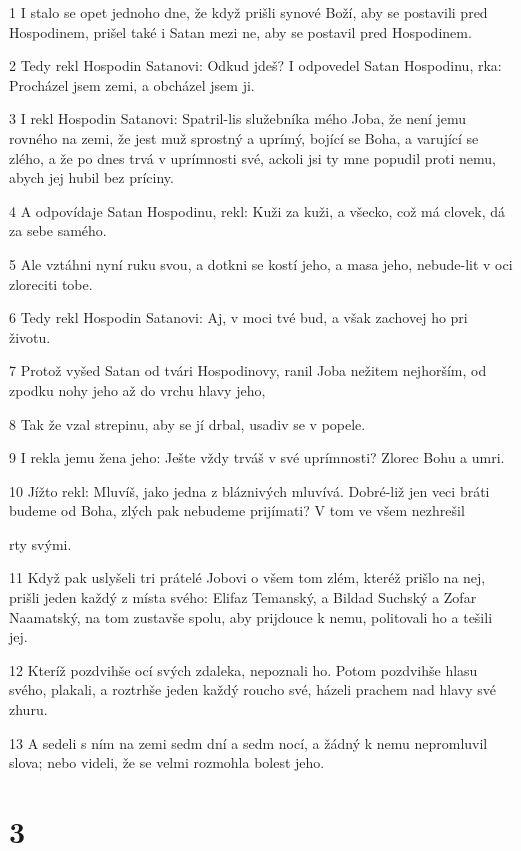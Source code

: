 \par 1 I stalo se opet jednoho dne, že když prišli synové Boží, aby se postavili pred Hospodinem, prišel také i Satan mezi ne, aby se postavil pred Hospodinem.
\par 2 Tedy rekl Hospodin Satanovi: Odkud jdeš? I odpovedel Satan Hospodinu, rka: Procházel jsem zemi, a obcházel jsem ji.
\par 3 I rekl Hospodin Satanovi: Spatril-lis služebníka mého Joba, že není jemu rovného na zemi, že jest muž sprostný a uprímý, bojící se Boha, a varující se zlého, a že po dnes trvá v uprímnosti své, ackoli jsi ty mne popudil proti nemu, abych jej hubil bez príciny.
\par 4 A odpovídaje Satan Hospodinu, rekl: Kuži za kuži, a všecko, což má clovek, dá za sebe samého.
\par 5 Ale vztáhni nyní ruku svou, a dotkni se kostí jeho, a masa jeho, nebude-lit v oci zloreciti tobe.
\par 6 Tedy rekl Hospodin Satanovi: Aj, v moci tvé bud, a však zachovej ho pri životu.
\par 7 Protož vyšed Satan od tvári Hospodinovy, ranil Joba nežitem nejhorším, od zpodku nohy jeho až do vrchu hlavy jeho,
\par 8 Tak že vzal strepinu, aby se jí drbal, usadiv se v popele.
\par 9 I rekla jemu žena jeho: Ješte vždy trváš v své uprímnosti? Zlorec Bohu a umri.
\par 10 Jížto rekl: Mluvíš, jako jedna z bláznivých mluvívá. Dobré-liž jen veci bráti budeme od Boha, zlých pak nebudeme prijímati? V tom ve všem nezhrešil \par rty svými.
\par 11 Když pak uslyšeli tri prátelé Jobovi o všem tom zlém, kteréž prišlo na nej, prišli jeden každý z místa svého: Elifaz Temanský, a Bildad Suchský a Zofar Naamatský, na tom zustavše spolu, aby prijdouce k nemu, politovali ho a tešili jej.
\par 12 Kteríž pozdvihše ocí svých zdaleka, nepoznali ho. Potom pozdvihše hlasu svého, plakali, a roztrhše jeden každý roucho své, házeli prachem nad hlavy své zhuru.
\par 13 A sedeli s ním na zemi sedm dní a sedm nocí, a žádný k nemu nepromluvil slova; nebo videli, že se velmi rozmohla bolest jeho.

\chapter{3}

